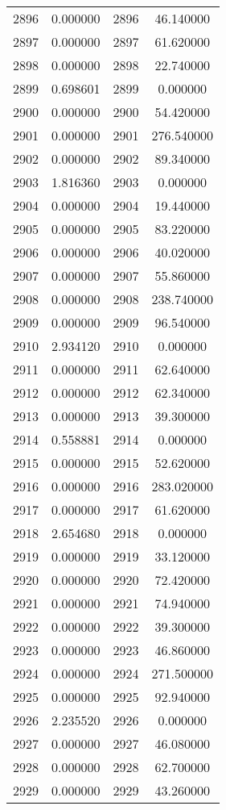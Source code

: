 \documentclass[12pt]{article}
\begin{document}
\begin{longtable}{@{}cccc@{}}
2896 & 0.000000 & 2896 & 46.140000 \\
2897 & 0.000000 & 2897 & 61.620000 \\
2898 & 0.000000 & 2898 & 22.740000 \\
2899 & 0.698601 & 2899 & 0.000000 \\
2900 & 0.000000 & 2900 & 54.420000 \\
2901 & 0.000000 & 2901 & 276.540000 \\
2902 & 0.000000 & 2902 & 89.340000 \\
2903 & 1.816360 & 2903 & 0.000000 \\
2904 & 0.000000 & 2904 & 19.440000 \\
2905 & 0.000000 & 2905 & 83.220000 \\
2906 & 0.000000 & 2906 & 40.020000 \\
2907 & 0.000000 & 2907 & 55.860000 \\
2908 & 0.000000 & 2908 & 238.740000 \\
2909 & 0.000000 & 2909 & 96.540000 \\
2910 & 2.934120 & 2910 & 0.000000 \\
2911 & 0.000000 & 2911 & 62.640000 \\
2912 & 0.000000 & 2912 & 62.340000 \\
2913 & 0.000000 & 2913 & 39.300000 \\
2914 & 0.558881 & 2914 & 0.000000 \\
2915 & 0.000000 & 2915 & 52.620000 \\
2916 & 0.000000 & 2916 & 283.020000 \\
2917 & 0.000000 & 2917 & 61.620000 \\
2918 & 2.654680 & 2918 & 0.000000 \\
2919 & 0.000000 & 2919 & 33.120000 \\
2920 & 0.000000 & 2920 & 72.420000 \\
2921 & 0.000000 & 2921 & 74.940000 \\
2922 & 0.000000 & 2922 & 39.300000 \\
2923 & 0.000000 & 2923 & 46.860000 \\
2924 & 0.000000 & 2924 & 271.500000 \\
2925 & 0.000000 & 2925 & 92.940000 \\
2926 & 2.235520 & 2926 & 0.000000 \\
2927 & 0.000000 & 2927 & 46.080000 \\
2928 & 0.000000 & 2928 & 62.700000 \\
2929 & 0.000000 & 2929 & 43.260000 \\

\end{longtable}
\end{document}

